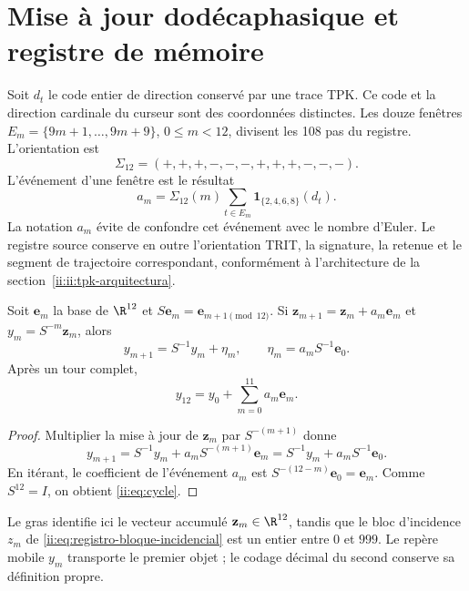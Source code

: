 \section{Mise à jour dodécaphasique et registre de mémoire}
\label{ii:sec:eta}
Soit $d_t$ le code entier de direction conservé par une trace TPK. Ce code et la direction cardinale du curseur sont des coordonnées distinctes. Les douze fenêtres $E_m=\{9m+1,\ldots,9m+9\}$, $0\le m<12$, divisent les 108 pas du registre. L'orientation est
\[
\Sigma_{12}=(+,+,+,-,-,-,+,+,+,-,-,-).
\]
L'événement d'une fenêtre est le résultat
\begin{equation}
a_m=\Sigma_{12}(m)
\sum_{t\in E_m}\mathbf1_{\{2,4,6,8\}}(d_t).
\label{ii:eq:events}
\end{equation}
La notation $a_m$ évite de confondre cet événement avec le nombre d’Euler. Le registre source conserve en outre l’orientation TRIT, la signature, la retenue et le segment de trajectoire correspondant, conformément à l’architecture de la section~\ref{ii:ii:tpk-arquitectura}.

\begin{proposition}
Soit $\mathbf e_m$ la base de $\R^{12}$ et
$S\mathbf e_m=\mathbf e_{m+1\pmod{12}}$. Si
$\mathbf z_{m+1}=\mathbf z_m+a_m\mathbf e_m$ et $y_m=S^{-m}\mathbf z_m$, alors
\begin{equation}
y_{m+1}=S^{-1}y_m+\eta_m,
\qquad
\eta_m=a_mS^{-1}\mathbf e_0.
\label{ii:eq:eta}
\end{equation}
Après un tour complet,
\begin{equation}
y_{12}=y_0+\sum_{m=0}^{11}a_m\mathbf e_m.
\label{ii:eq:cycle}
\end{equation}
\end{proposition}
\begin{proof}
Multiplier la mise à jour de $\mathbf z_m$ par $S^{-(m+1)}$ donne
\[
y_{m+1}=S^{-1}y_m+a_mS^{-(m+1)}\mathbf e_m
=S^{-1}y_m+a_mS^{-1}\mathbf e_0.
\]
En itérant, le coefficient de l’événement $a_m$ est
$S^{-(12-m)}\mathbf e_0=\mathbf e_m$. Comme $S^{12}=I$,
on obtient \eqref{ii:eq:cycle}.
\end{proof}

Le gras identifie ici le vecteur accumulé
\(\mathbf z_m\in\R^{12}\), tandis que le bloc d’incidence
\(z_m\) de \eqref{ii:eq:registro-bloque-incidencial} est un entier entre
\(0\) et \(999\). Le repère mobile \(y_m\) transporte le premier objet ;
le codage décimal du second conserve sa définition propre.

